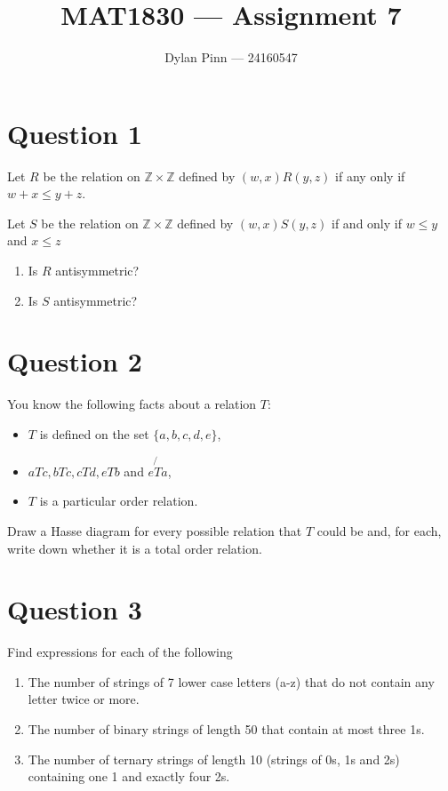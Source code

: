 \documentclass[11pt]{article}
\begin{document}
\title{MAT1830 --- Assignment 7}
\author{Dylan Pinn --- 24160547}
\maketitle

\section*{Question 1}

Let $R$ be the relation on $\mathbb{Z} \times \mathbb{Z}$ defined by $(w, x)R(y,
z)$ if any only if $w + x \leq y + z$.

Let $S$ be the relation on $\mathbb{Z} \times \mathbb{Z}$ defined by $(w, x)S(y,
z)$ if and only if $w \leq y$ and $x \leq z$

\begin{enumerate}[label= (\alph*)]
  \item Is $R$ antisymmetric?

  \item Is $S$ antisymmetric?
\end{enumerate}

\section*{Question 2}

You know the following facts about a relation $T$:

\begin{itemize}
  \item $T$ is defined on the set $\{a, b, c, d, e \}$,
  \item $aTc, bTc, cTd, eTb$ and $e\not{T}a$,
  \item $T$ is a particular order relation.
\end{itemize}

Draw a Hasse diagram for every possible relation that $T$ could be and, for
each, write down whether it is a total order relation.

\section*{Question 3}

Find expressions for each of the following

\begin{enumerate}[label= (\alph*)]
  \item The number of strings of 7 lower case letters (a-z) that do not contain
    any letter twice or more.

  \item The number of binary strings of length 50 that contain at most three 1s.

  \item The number of ternary strings of length 10 (strings of 0s, 1s and 2s)
    containing one 1 and exactly four 2s.
\end{enumerate}
\end{document}
